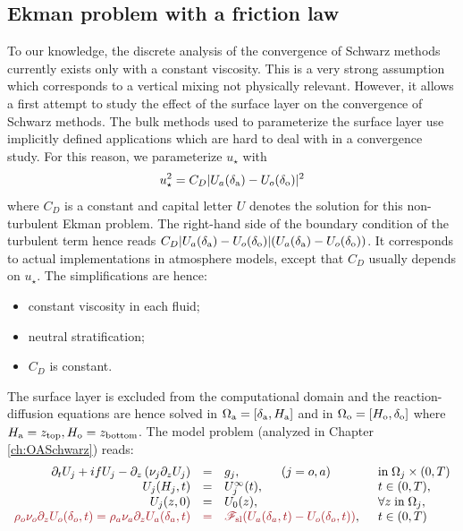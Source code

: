 \subsection{Ekman problem with a friction law}
\label{sec:airseaSCM_hierarchy_Ekman}
To our knowledge, the discrete analysis of the convergence of Schwarz
methods currently exists only with a constant viscosity.
This is a very strong assumption
which corresponds to a vertical mixing not physically relevant.
However, it allows a first attempt to study the
effect of the surface layer on the convergence of Schwarz methods.
The bulk methods used to parameterize the surface layer use
implicitly defined applications which are hard to deal with
in a convergence study. For this reason, we parameterize
$u_\star$ with
\begin{equation}
	{u_\star^2} = C_D {|U_a(\delta_{\rm a}) - U_o(\delta_{\rm o})|^2}
\end{equation}
where $C_D$ is a constant and capital letter $U$ denotes
the solution for this non-turbulent Ekman problem.
The right-hand side of the boundary condition of the
turbulent term hence reads
$C_D|U_a(\delta_{\rm a}) - U_o(\delta_{\rm o})|
(U_a(\delta_{\rm a}) - U_o(\delta_{\rm o}))$.
It corresponds to actual implementations
in atmosphere models, except that $C_D$ usually depends on $u_\star$.
The simplifications are hence:
\begin{itemize}
	\item constant viscosity in each fluid;
	\item neutral stratification;
	\item $C_D$ is constant.
\end{itemize}
The surface layer is excluded from the computational domain and
the reaction-diffusion equations are hence solved in
$\Omega_{\rm a} = [\delta_{\rm a},H_{\rm a}]$ and
in $\Omega_{\rm o} = [H_{\rm o},\delta_{\rm o}]$ where
$H_{\rm a}=z_{\rm top}, H_{\rm o}=z_{\rm bottom}$.
The model problem (analyzed in Chapter \ref{ch:OASchwarz}) reads:
\begin{equation}
\label{eq:airseaSCM_cplProblem}
\begin{array}{rcll}
\partial_t U_j + i f U_j -
	\partial_z \left( \nu_j \partial_z U_j \right) &=& g_j,
~~~~~~~~~~ (j=o,a)
& \mbox{in}\;\Omega_j \times (0,T)\\
U_j(H_j,t) &=& U_j^\infty(t),  & t \in (0,T), \\ 
U_j(z,0) &=& U_0(z), & \forall z \; \mbox{in}\; \Omega_j, \\
	\emphase{\rho_o \nu_o \partial_z U_o(\delta_o,t) = \rho_a \nu_a \partial_z U_a(\delta_a,t)}
	&\emphase{=}&
	\emphase{{\cal F}_{\rm sl}( U_a(\delta_a,t)-U_o(\delta_o,t) )}, \;\; & t \in (0,T)
\end{array}
\end{equation}
